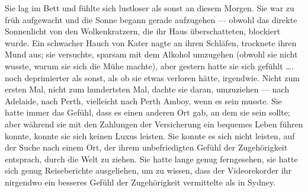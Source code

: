 Sie lag im Bett und fühlte sich lustloser als sonst an diesem Morgen. Sie war zu früh aufgewacht und die Sonne begann gerade aufzugehen — obwohl das direkte Sonnenlicht von den Wolkenkratzern, die ihr Haus überschatteten, blockiert wurde. Ein schwacher Hauch von Kater nagte an ihren Schläfen, trocknete ihren Mund aus; sie versuchte, sparsam mit dem Alkohol umzugehen (obwohl sie nicht wusste, warum sie sich die Mühe machte), aber gestern hatte sie sich gefühlt …. noch deprimierter als sonst, als ob sie etwas verloren hätte, irgendwie. Nicht zum ersten Mal, nicht zum hundertsten Mal, dachte sie daran, umzuziehen — nach Adelaide, nach Perth, vielleicht nach Perth Amboy, wenn es sein musste. Sie hatte immer das Gefühl, dass es einen anderen Ort gab, an dem sie sein sollte; aber während sie mit den Zahlungen der Versicherung ein bequemes Leben führen konnte, konnte sie sich keinen Luxus leisten. Sie konnte es sich nicht leisten, auf der Suche nach einem Ort, der ihrem unbefriedigten Gefühl der Zugehörigkeit entsprach, durch die Welt zu ziehen. Sie hatte lange genug ferngesehen, sie hatte sich genug Reiseberichte ausgeliehen, um zu wissen, dass der Videorekorder ihr nirgendwo ein besseres Gefühl der Zugehörigkeit vermittelte als in Sydney.

